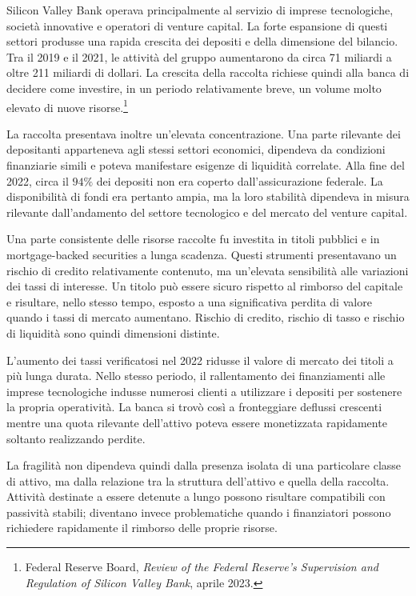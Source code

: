 Silicon Valley Bank operava principalmente al servizio di imprese
tecnologiche, societ\`{a} innovative e operatori di venture capital. La
forte espansione di questi settori produsse una rapida crescita dei
depositi e della dimensione del bilancio. Tra il 2019 e il 2021, le
attivit\`{a} del gruppo aumentarono da circa 71 miliardi a oltre 211
miliardi di dollari. La crescita della raccolta richiese quindi alla banca
di decidere come investire, in un periodo relativamente breve, un volume
molto elevato di nuove risorse.\footnote{Federal Reserve Board,
\emph{Review of the Federal Reserve's Supervision and Regulation of
Silicon Valley Bank}, aprile 2023.}

La raccolta presentava inoltre un'elevata concentrazione. Una parte
rilevante dei depositanti apparteneva agli stessi settori economici,
dipendeva da condizioni finanziarie simili e poteva manifestare esigenze
di liquidit\`{a} correlate. Alla fine del 2022, circa il $94\%$ dei
depositi non era coperto dall'assicurazione federale. La disponibilit\`{a}
di fondi era pertanto ampia, ma la loro stabilit\`{a} dipendeva in misura
rilevante dall'andamento del settore tecnologico e del mercato del venture
capital.

Una parte consistente delle risorse raccolte fu investita in titoli
pubblici e in mortgage-backed securities a lunga scadenza. Questi
strumenti presentavano un rischio di credito relativamente contenuto, ma
un'elevata sensibilit\`{a} alle variazioni dei tassi di interesse. Un
titolo pu\`{o} essere sicuro rispetto al rimborso del capitale e risultare,
nello stesso tempo, esposto a una significativa perdita di valore quando i
tassi di mercato aumentano. Rischio di credito, rischio di tasso e rischio
di liquidit\`{a} sono quindi dimensioni distinte.

L'aumento dei tassi verificatosi nel 2022 ridusse il valore di mercato dei
titoli a pi\`{u} lunga durata. Nello stesso periodo, il rallentamento dei
finanziamenti alle imprese tecnologiche indusse numerosi clienti a
utilizzare i depositi per sostenere la propria operativit\`{a}. La banca
si trov\`{o} cos\`{i} a fronteggiare deflussi crescenti mentre una quota
rilevante dell'attivo poteva essere monetizzata rapidamente soltanto
realizzando perdite.

La fragilit\`{a} non dipendeva quindi dalla presenza isolata di una
particolare classe di attivo, ma dalla relazione tra la struttura
dell'attivo e quella della raccolta. Attivit\`{a} destinate a essere
detenute a lungo possono risultare compatibili con passivit\`{a} stabili;
diventano invece problematiche quando i finanziatori possono richiedere
rapidamente il rimborso delle proprie risorse.

